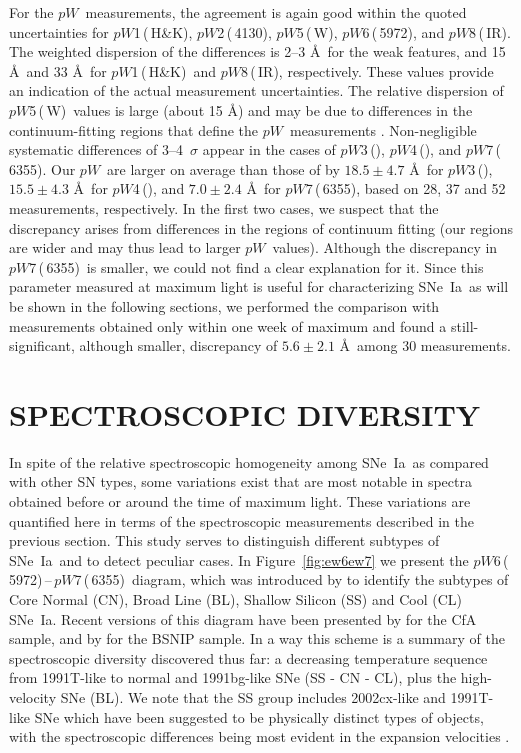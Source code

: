 \documentclass[apj]{emulateapj-rtx4}
\newcommand{\ew}{$pW$}
\newcommand{\pwone}{$pW$1\,(\ion{Ca}{2}\,H\&K)}
\newcommand{\pwtwo}{$pW$2\,(\ion{Si}{2}\,4130)}
\newcommand{\pwthree}{$pW$3\,(\ion{Mg}{2})}
\newcommand{\pwfour}{$pW$4\,(\ion{Fe}{2})}
\newcommand{\pwfive}{$pW$5\,(\ion{S}{2}\,W)}
\newcommand{\pwsix}{$pW$6\,(\ion{Si}{2}\,5972)}
\newcommand{\pwseven}{$pW$7\,(\ion{Si}{2}\,6355)}
\newcommand{\pweight}{$pW$8\,(\ion{Ca}{2}\,IR)}
\newcommand{\sneia}{SNe~Ia}
\begin{document}
For the \ew\ measurements, the agreement is again good within the
quoted uncertainties for \pwone, \pwtwo, \pwfive, \pwsix, and
\pweight. The weighted dispersion of the differences is 2--3
\AA\ for the weak 
 features, and 15 \AA\ and 33 \AA\ for \pwone\ and
\pweight, respectively. These values provide an indication of the
actual measurement uncertainties. The relative dispersion of
\pwfive\ values is large (about 15 \AA) and may be due to differences
in the continuum-fitting regions that define the \ew\ measurements
\citep[compare Table~\ref{tab:featw} in this paper with Table~1
  of][]{silverman12b}. Non-negligible systematic differences of
3--4~$\sigma$ appear in the cases of \pwthree, \pwfour, and
\pwseven. Our \ew\ are larger on average than those of
\citet{silverman12b} by $18.5\pm4.7$ \AA\ for \pwthree, $15.5\pm4.3$
\AA\ for \pwfour, and $7.0\pm2.4$ \AA\ for \pwseven, based on 
28, 37 and 52 measurements, respectively. In the first two cases, we
suspect that the discrepancy arises from differences in the regions of
continuum fitting (our regions are wider and may thus lead to larger
\ew\ values). Although the discrepancy in \pwseven\ is smaller, we
could not find a clear explanation for it. Since this parameter
measured at maximum light is useful for characterizing \sneia\ as will
be shown in the following sections, we performed the comparison with
measurements obtained only within one week of maximum and found a
still-significant, although smaller, discrepancy of $5.6\pm2.1$
\AA\ among 30 measurements.

\section{SPECTROSCOPIC DIVERSITY}
\label{sec:spdiv}

In spite of the relative spectroscopic homogeneity among
\sneia\ as compared with other SN types, some variations exist that
are most notable in spectra obtained before or around the time of
maximum light. These variations are quantified here in terms of the
spectroscopic measurements described in the previous section. This
study serves to distinguish different subtypes of \sneia\ and to
detect peculiar cases. In Figure~\ref{fig:ew6ew7} we present the
\pwsix\,--\,\pwseven\ diagram, which was introduced by \citet{branch06}
to identify the subtypes of Core Normal (CN), Broad Line (BL),
Shallow Silicon (SS) and Cool (CL) \sneia. Recent versions of this
diagram have been presented by \citet{blondin12} for the CfA sample,
and by \citet{silverman12b} for the BSNIP sample. In a way this
scheme is a summary of the spectroscopic diversity discovered thus
far: a decreasing temperature sequence from 1991T-like to normal and
1991bg-like SNe (SS - CN - CL), plus the high-velocity SNe (BL). We
note that the SS group includes 2002cx-like and 1991T-like SNe which
have been suggested to be physically distinct types of objects, with
the spectroscopic differences being most evident in the expansion
velocities \citep{li03,branch04,phillips07}.
\end{document}
